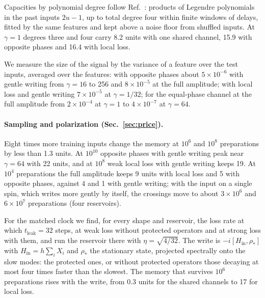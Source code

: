 Capacities by polynomial degree follow Ref.~\cite{Dambre2012}: products of Legendre polynomials in the past inputs
$2u-1$, up to total degree four within finite windows of delays, fitted by the same features and kept above a noise
floor from shuffled inputs. At $\gamma=1$ degrees three and four carry 8.2 units with one shared channel, 15.9 with
opposite phases and 16.4 with local loss.

We measure the size of the signal by the variance of a feature over the test inputs, averaged over the features: with
opposite phases about $5\times10^{-6}$ with gentle writing from $\gamma=16$ to 256 and $8\times10^{-5}$ at the full
amplitude; with local loss and gentle writing $7\times10^{-5}$ at $\gamma=1/32$; for the equal-phase channel at the
full amplitude from $2\times10^{-4}$ at $\gamma=1$ to $4\times10^{-7}$ at $\gamma=64$.

\paragraph{Sampling and polarization (Sec.~\ref{sec:price}).}
Eight times more training inputs change the memory at $10^6$ and $10^8$ preparations by less than 1.3 units. At
$10^{10}$ opposite phases with gentle writing peak near $\gamma=64$ with 22 units, and at $10^8$ weak local loss with
gentle writing keeps 19. At $10^4$ preparations the full amplitude keeps 9 units with local loss and 5 with opposite
phases, against 4 and 1 with gentle writing; with the input on a single spin, which writes more gently by itself, the
crossings move to about $3\times10^6$ and $6\times10^7$ preparations (four reservoirs).

For the matched clock we find, for every shape and reservoir, the loss rate at which $t_{\mathrm{leak}}=32$ steps, at
weak loss without protected operators and at strong loss with them, and run the reservoir there with
$\eta=\sqrt{4/32}$. The write is $-i[H_{\mathrm{in}},\rho_*]$ with $H_{\mathrm{in}}=h\sum_iX_i$ and $\rho_*$ the
stationary state, projected spectrally onto the slow modes: the protected ones, or without protected operators those
decaying at most four times faster than the slowest. The memory that survives $10^6$ preparations rises with the
write, from 0.3 units for the shared channels to 17 for local loss.

